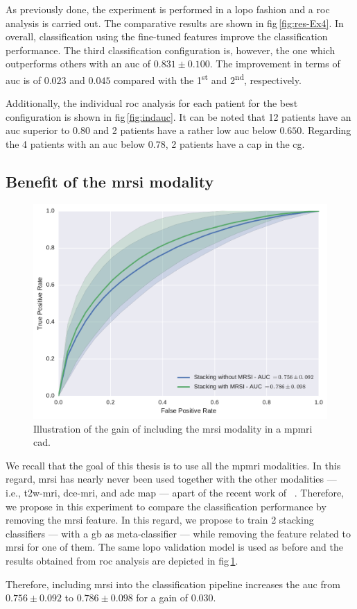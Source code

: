 As previously done, the experiment is performed in a \ac{lopo} fashion and a \ac{roc} analysis is carried out.
The comparative results are shown in \acs{fig}\,\ref{fig:res-Ex4}.
In overall, classification using the fine-tuned features improve the classification performance.
The third classification configuration is, however, the one which outperforms others with an \ac{auc} of $0.831 \pm 0.100$.
The improvement in terms of \ac{auc} is of $0.023$ and $0.045$ compared with the 1\textsuperscript{st} and 2\textsuperscript{nd}, respectively.

Additionally, the individual \ac{roc} analysis for each patient for the best configuration is shown in \acs{fig}\,\ref{fig:indauc}.
It can be noted that 12 patients have an \ac{auc} superior to $0.80$ and 2 patients have a rather low \ac{auc} below $0.650$.
Regarding the 4 patients with an \ac{auc} below $0.78$, 2 patients have a \ac{cap} in the \ac{cg}.

\subsection{Benefit of the \acs*{mrsi} modality}\label{subsec:chp6:exp-res:Ex5}

\begin{figure}
  \centering
  \includegraphics[width=0.7\linewidth]{6_pipeline/figures/exp-6/stacking_wt_mrsi.pdf}
  \caption{Illustration of the gain of including the \acs*{mrsi} modality in a \acs*{mpmri} \acs*{cad}.}
  \label{fig:resmrsigain}
\end{figure}

We recall that the goal of this thesis is to use all the \ac{mpmri} modalities.
In this regard, \ac{mrsi} has nearly never been used together with the other modalities --- i.e., \ac{t2w}-\ac{mri}, \ac{dce}-\ac{mri}, and \ac{adc} map --- apart of the recent work of \citeauthor{trigui2017automatic}~\cite{trigui2016classification,trigui2017automatic}.
Therefore, we propose in this experiment to compare the classification performance by removing the \ac{mrsi} feature.
In this regard, we propose to train 2 stacking classifiers --- with a \ac{gb} as meta-classifier --- while removing the feature related to \ac{mrsi} for one of them.
The same \ac{lopo} validation model is used as before and the results obtained from \ac{roc} analysis are depicted in \acs{fig}\,\ref{fig:resmrsigain}.

Therefore, including \ac{mrsi} into the classification pipeline increases the \ac{auc} from $0.756 \pm 0.092$ to $0.786 \pm 0.098$ for a gain of $0.030$.